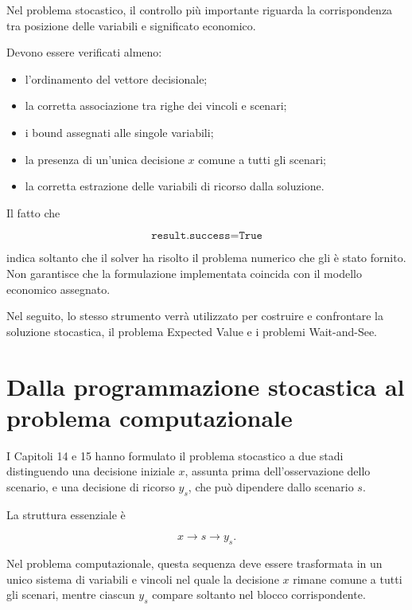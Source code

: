 Nel problema stocastico, il controllo pi\`u importante riguarda la
corrispondenza tra posizione delle variabili e significato economico.

Devono essere verificati almeno:

\begin{itemize}
\item l'ordinamento del vettore decisionale;

\item la corretta associazione tra righe dei vincoli e scenari;

\item i bound assegnati alle singole variabili;

\item la presenza di un'unica decisione \(x\) comune a tutti gli scenari;

\item la corretta estrazione delle variabili di ricorso dalla soluzione.
\end{itemize}

Il fatto che

\[
\texttt{result.success=True}
\]

\noindent indica soltanto che il solver ha risolto il problema numerico che
gli \`e stato fornito. Non garantisce che la formulazione implementata
coincida con il modello economico assegnato.

Nel seguito, lo stesso strumento verr\`a utilizzato per costruire e
confrontare la soluzione stocastica, il problema Expected Value e i problemi
Wait-and-See.



\section{Dalla programmazione stocastica al problema computazionale}

I Capitoli 14 e 15 hanno formulato il problema stocastico a due stadi
distinguendo una decisione iniziale \(x\), assunta prima dell'osservazione
dello scenario, e una decisione di ricorso \(y_s\), che pu\`o dipendere dallo
scenario \(s\).

La struttura essenziale \`e

\[
x
\longrightarrow
s
\longrightarrow
y_s.
\]

Nel problema computazionale, questa sequenza deve essere trasformata in un
unico sistema di variabili e vincoli nel quale la decisione \(x\) rimane
comune a tutti gli scenari, mentre ciascun \(y_s\) compare soltanto nel blocco
corrispondente.

